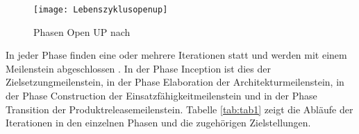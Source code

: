 \begin{figure}[htp]
\begin{center}
  \texttt{[image: Lebenszyklusopenup]} %
  \caption{Phasen Open UP nach \cite{eclipseopenup}}
  \label{fig:Phasen}
\end{center}
\end{figure}


In jeder Phase finden eine oder mehrere Iterationen statt und werden mit einem Meilenstein abgeschlossen \cite{Basem2010}. In der Phase Inception ist dies der Zielsetzungmeilenstein, in der Phase Elaboration der Architekturmeilenstein, in der Phase Construction der Einsatzfähigkeitmeilenstein und in der Phase Transition der Produktreleasemeilenstein. Tabelle \ref{tab:tab1} zeigt die Abläufe der Iterationen in den einzelnen Phasen und die zugehörigen Zielstellungen.



